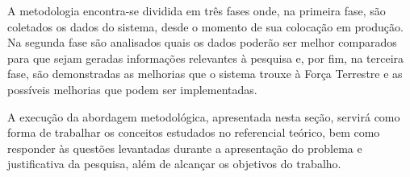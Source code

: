 A metodologia encontra-se dividida em três fases onde, na primeira fase, são coletados os dados do sistema, desde o momento de sua colocação em produção. Na segunda fase são analisados quais os dados poderão ser melhor comparados para que sejam geradas informações relevantes à pesquisa e, por fim, na terceira fase, são demonstradas as melhorias que o sistema trouxe à Força Terrestre e as possíveis melhorias que podem ser implementadas.

A execução da abordagem metodológica, apresentada nesta seção, servirá como forma de trabalhar os conceitos estudados no referencial teórico, bem como responder às questões levantadas durante a apresentação do problema e justificativa da pesquisa, além de alcançar os objetivos do trabalho.




